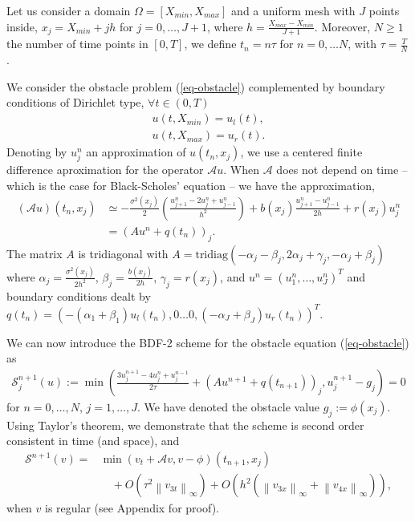 \documentclass[12pt,a4paper]{article}
\newcommand{\ninf}[1]{\left\| {#1} \right\|_\infty}
\begin{document}
Let us consider a domain $\Omega = [X_{min}, X_{max}]$ and a uniform mesh with $J$ points inside, $x_j = X_{min} + jh$ for $j = 0, \dots, J+1$, where $h = \frac{X_{max} - X_{min}}{J+1}$. Moreover, $N \geq 1$ the number of time points in $[0,T]$, we define $t_n = n \tau$ for $n = 0, \dots N$, with $\tau = \frac{T}{N}$.

We consider the obstacle problem (\ref{eq-obstacle}) complemented by boundary conditions of Dirichlet type, $\forall t \in (0,T)$
\begin{align} 
	u(t, X_{min}) = u_l(t), \label{eq-obstacle_ul}\\
	u(t, X_{max}) = u_r(t). \label{eq-obstacle_ur}
\end{align}
Denoting by $u_j^n$ an approximation of $u(t_n, x_j)$, we use a centered finite difference aproximation for the operator $\mathcal{A} u$. When $\mathcal{A}$ does not depend on time -- which is the case for Black-Scholes' equation -- we have the approximation,
\begin{align*}
	(\mathcal{A} u)(t_n, x_j) &\simeq - \frac{\sigma^2(x_j)}{2} \left( \frac{u_{j+1}^n - 2u_j^n + u_{j-1}^n}{h^2} \right) + b(x_j) \frac{u_{j+1}^n - u_{j-1}^n}{2h} + r(x_j) u_j^n \\
	& = \left( A u^n + q(t_n) \right)_j.
\end{align*}
The matrix $A$ is tridiagonal with $A = \text{tridiag} \left( -\alpha_j-\beta_j, 2\alpha_j + \gamma_j, -\alpha_j+\beta_j \right)$ where $\alpha_j = \frac{\sigma^2(x_j)}{2h^2}$, $\beta_j = \frac{b(x_j)}{2h}$, $\gamma_j = r(x_j)$, and $u^n = (u_1^n, \dots, u_J^n)^T$ and boundary conditions dealt by $q(t_n) = \left( -(\alpha_1+\beta_1) u_l(t_n), 0 \dots 0, (-\alpha_J+\beta_J) u_r(t_n) \right)^T$.

We can now introduce the BDF-2 scheme for the obstacle equation (\ref{eq-obstacle}) as
\begin{align}
	\mathcal{S}_j^{n+1} (u) := \min\left( \frac{3 u_j^{n+1} - 4 u_j^n + u_j^{n-1}}{2 \tau} + (A u^{n+1} + q(t_{n+1}))_j, u_j^{n+1} - g_j \right) = 0 \label{eq-BDF2}
\end{align}
for $n=0,\dots,N$, $j=1,\dots,J$. We have denoted the obstacle value $g_j := \phi(x_j)$. Using Taylor's theorem, we demonstrate that the scheme is second order consistent in time (and space), and
\begin{align*}
	\mathcal{S}^{n+1} (v) = & \min (v_t + \mathcal{A}v, v-\phi)(t_{n+1}, x_j) \\ 
		& \quad + O(\tau^2 \ninf{v_{3t}}) + O(h^2 (\ninf{v_{3x}} + \ninf{v_{4x}})),
\end{align*}
when $v$ is regular (see Appendix for proof). 
\end{document}
